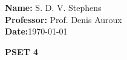 \documentclass{report}
\begin{document}
\begin{titlebox}[Math 55a]
    \textbf{Name:} S. D. V. Stephens\\[2mm]
    \textbf{Professor:} Prof. Denis Auroux\\[2mm]
    \textbf{Date:}\today 
\tcblower
    \begin{center}
    \vspace{4mm}
    {\Huge\bfseries PSET 4}
    \end{center}
\end{titlebox}
\vspace{10mm}

\qs{}{}
\sol 

\qs{}{}
\sol 

\qs{}{}
\sol
\end{document}
